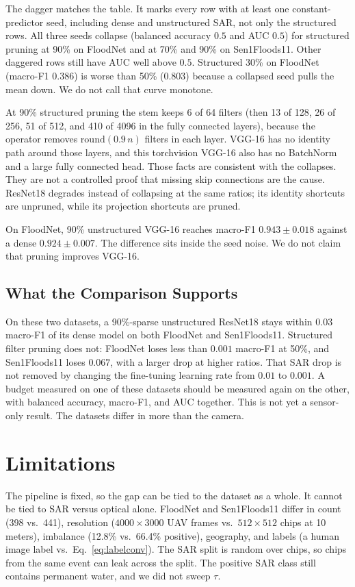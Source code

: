 \documentclass[conference]{IEEEtran}
\begin{document}
The dagger matches the table. It marks every row with at least one
constant-predictor seed, including dense and unstructured SAR, not only
the structured rows. All three seeds collapse (balanced accuracy $0.5$
and AUC $0.5$) for structured pruning at 90\% on FloodNet and at 70\%
and 90\% on Sen1Floods11. Other daggered rows still have AUC well above
$0.5$. Structured 30\% on FloodNet (macro-F1 $0.386$) is worse than
50\% ($0.803$) because a collapsed seed pulls the mean down. We do not
call that curve monotone.

At 90\% structured pruning the stem keeps 6 of 64 filters (then 13 of
128, 26 of 256, 51 of 512, and 410 of 4096 in the fully connected
layers), because the operator removes $\mathrm{round}(0.9\,n)$ filters
in each layer. VGG-16 has no identity path around those layers, and
this torchvision VGG-16 also has no BatchNorm and a large fully
connected head. Those facts are consistent with the collapses. They
are not a controlled proof that missing skip connections are the cause.
ResNet18 degrades instead of collapsing at the same ratios; its
identity shortcuts are unpruned, while its projection shortcuts are
pruned.

On FloodNet, 90\% unstructured VGG-16 reaches macro-F1
$0.943\pm0.018$ against a dense $0.924\pm0.007$. The difference sits
inside the seed noise. We do not claim that pruning improves VGG-16.

\subsection{What the Comparison Supports}
On these two datasets, a 90\%-sparse unstructured ResNet18 stays within
$0.03$ macro-F1 of its dense model on both FloodNet and Sen1Floods11.
Structured filter pruning does not: FloodNet loses less than $0.001$
macro-F1 at 50\%, and Sen1Floods11 loses $0.067$, with a larger drop at
higher ratios. That SAR drop is not removed by changing the fine-tuning
learning rate from $0.01$ to $0.001$. A budget measured on one of these
datasets should be measured again on the other, with balanced accuracy,
macro-F1, and AUC together. This is not yet a sensor-only result. The
datasets differ in more than the camera.

\section{Limitations}
The pipeline is fixed, so the gap can be tied to the dataset as a
whole. It cannot be tied to SAR versus optical alone. FloodNet and
Sen1Floods11 differ in count (398 vs.\ 441), resolution
($4000\times3000$ UAV frames vs.\ $512\times512$ chips at 10 meters),
imbalance (12.8\% vs.\ 66.4\% positive), geography, and labels (a human
image label vs.\ Eq.~\eqref{eq:labelconv}). The SAR split is random
over chips, so chips from the same event can leak across the split.
The positive SAR class still contains permanent water, and we did not
sweep $\tau$.
\end{document}

